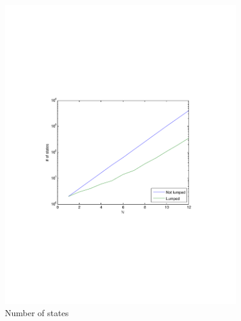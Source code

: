 \documentclass[10pt,a4paper]{article}
\begin{document}
\begin{figure}[h!tb]
\centering
\includegraphics[clip=true, trim=9em 24em 9em 24em, width=0.9\textwidth]{resources/plotlumping.pdf}
\caption{Number of states}
\label{figlump}
\end{figure}
\end{document}
